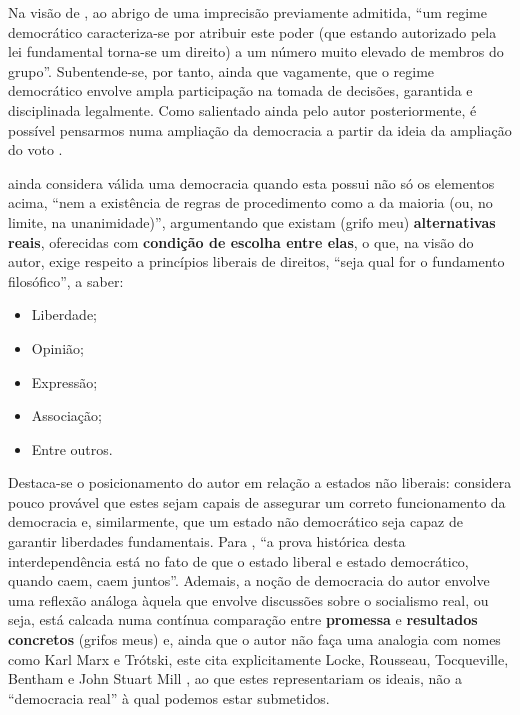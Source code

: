 \documentclass[
article,			%
11pt,				%
oneside,			%
a4paper,			%
english,			%
brazil,				%
sumario=tradicional
]{abntex2}
\begin{document}
	Na visão de , ao abrigo de uma imprecisão previamente admitida, ``um regime democrático caracteriza-se por atribuir este poder (que estando autorizado pela lei fundamental torna-se um direito) a um número muito elevado de membros do grupo''. Subentende-se, por tanto, ainda que vagamente, que o regime democrático envolve ampla participação na tomada de decisões, garantida e disciplinada legalmente. Como salientado ainda pelo autor posteriormente, é possível pensarmos numa ampliação da democracia a partir da ideia da ampliação do voto \cite[p. 3]{bobbio1986a}.
	
	 ainda considera válida uma democracia quando esta possui não só os elementos acima, ``nem a existência de regras de procedimento como a da maioria (ou, no limite, na unanimidade)'', argumentando que existam (grifo meu) \textbf{alternativas reais}, oferecidas com \textbf{condição de escolha entre elas}, o que, na visão do autor, exige respeito a princípios liberais de direitos, ``seja qual for o fundamento filosófico'', a saber:
	
	\begin{itemize}
		\item Liberdade;
		\item Opinião;
		\item Expressão;
		\item Associação;
		\item Entre outros.
	\end{itemize}

	Destaca-se o posicionamento do autor em relação a estados não liberais:  considera pouco provável que estes sejam capais de assegurar um correto funcionamento da democracia e, similarmente, que um estado não democrático seja capaz de garantir liberdades fundamentais. Para , ``a prova histórica desta interdependência está no fato de que o estado liberal e estado democrático, quando caem, caem juntos''. Ademais, a noção de democracia do autor envolve uma reflexão análoga àquela que envolve discussões sobre o socialismo real, ou seja, está calcada numa contínua comparação entre \textbf{promessa} e \textbf{resultados concretos} (grifos meus) e, ainda que o autor não faça uma analogia com nomes como Karl Marx e Trótski, este cita explicitamente Locke, Rousseau, Tocqueville, Bentham e John Stuart Mill \cite[p. 5]{bobbio1986a}, ao que estes representariam os ideais, não a ``democracia real'' à qual podemos estar submetidos.
	
\end{document}
